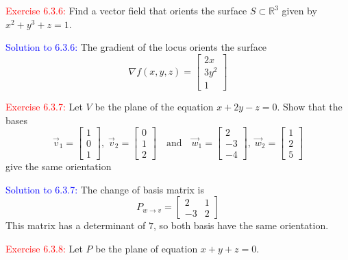 \documentclass[12pt]{article}
\begin{document}
{\textcolor{red}{Exercise 6.3.6:}
Find a vector field that orients the surface $S \subset \mathbb{R}^3$ given
by $x^2+y^3+z=1$.
\smallskip

\textcolor{blue}{Solution to 6.3.6:}
    The gradient of the locus orients the surface
    \[
        \nabla f(x, y, z) =
        \begin{bmatrix}
            2x \\ 3y^2 \\ 1
        \end{bmatrix} 
    \]
\newpage

\textcolor{red}{Exercise 6.3.7:}
Let $V$ be the plane of the equation $x+2y-z=0$. Show that the bases
\begin{equation*}
    \vec v_1 = \begin{bmatrix}
        1\\0\\1
    \end{bmatrix},\;
    \vec v_2 = \begin{bmatrix}
        0\\1\\2
    \end{bmatrix}
    \quad \text{and} \quad
    \vec w_1 = \begin{bmatrix}
        2\\-3\\-4
    \end{bmatrix},\;
    \vec w_2 = \begin{bmatrix}
        1\\2\\5
    \end{bmatrix}
\end{equation*}
give the same orientation
\smallskip

\textcolor{blue}{Solution to 6.3.7:}
    The change of basis matrix is 
    \[
        P_{w \to v} = 
        \begin{bmatrix}
            2 & 1 \\
            -3 & 2
        \end{bmatrix}
    \]
    This matrix has a determinant of $7$, 
    so both basis have the same orientation.
\newpage

\textcolor{red}{Exercise 6.3.8:}
Let $P$ be the plane of equation $x+y+z=0$.
\smallskip

}
\end{document}
